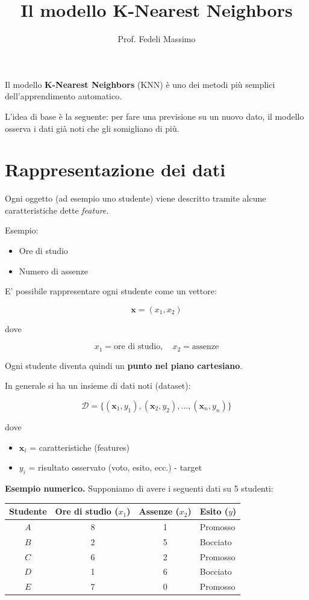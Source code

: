 \documentclass{article}
\title{Il modello K-Nearest Neighbors}
\author{Prof. Fedeli Massimo}
\date{}
\begin{document}
	
	\maketitle
	
	Il modello \textbf{K-Nearest Neighbors} (KNN) è uno dei metodi più semplici dell'apprendimento automatico.
	
	L'idea di base è la seguente: per fare una previsione su un nuovo dato, il modello osserva i dati già noti che gli somigliano di più.
	
	
	\section*{Rappresentazione dei dati}
	
	Ogni oggetto (ad esempio uno studente) viene descritto tramite alcune caratteristiche dette \textit{feature}.
	
	Esempio:
	
	\begin{itemize}
		\item Ore di studio
		\item Numero di assenze
	\end{itemize}
	
	E' possibile rappresentare ogni studente come un vettore:
	
	\[
	\mathbf{x} = (x_1, x_2)
	\]
	
	dove
	
	\[
	x_1 = \text{ore di studio}, \quad x_2 = \text{assenze}
	\]
	
	Ogni studente diventa quindi un \textbf{punto nel piano cartesiano}.
	
	In generale si ha un insieme di dati noti (dataset):
	
	\[
	\mathcal{D} = \{(\mathbf{x}_1,y_1), (\mathbf{x}_2,y_2), \dots, (\mathbf{x}_n,y_n)\}
	\]
	
	dove
	
	\begin{itemize}
		\item $\mathbf{x}_i$ = caratteristiche (features)
		\item $y_i$ = risultato osservato (voto, esito, ecc.)  - target
	\end{itemize}
	
	\textbf{Esempio numerico.} Supponiamo di avere i seguenti dati su 5 studenti:
	
	\begin{center}
		\begin{tabular}{cccl}
			\toprule
			Studente & Ore di studio ($x_1$) & Assenze ($x_2$) & Esito ($y$) \\
			\midrule
			$A$ & 8 & 1 & Promosso \\
			$B$ & 2 & 5 & Bocciato  \\
			$C$ & 6 & 2 & Promosso  \\
			$D$ & 1 & 6 & Bocciato  \\
			$E$ & 7 & 0 & Promosso  \\
			\bottomrule
		\end{tabular}
	\end{center}
	
\end{document}
